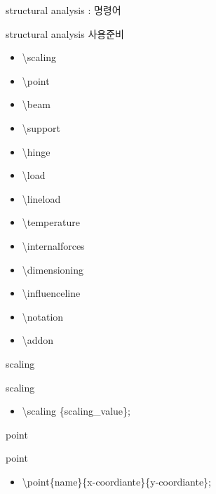 \documentclass[ aspectratio=169,  12pt,blue,xcolor=pdftex,dvipsnames,table,handout,notes]{beamer}
\begin{document}
		\begin{frame}[t]{structural analysis : 명령어}
 
			\begin{block}{structural analysis 사용준비}
			\begin{itemize}
			\item[] \textbackslash scaling 
			\item[] \textbackslash point 
			\item[] \textbackslash beam 
			\item[] \textbackslash support
			\item[] \textbackslash hinge
			\item[] \textbackslash load 
			\item[] \textbackslash lineload
			\item[] \textbackslash temperature
			\item[] \textbackslash internalforces
			\item[] \textbackslash dimensioning
			\item[] \textbackslash influenceline
			\item[] \textbackslash notation
			\item[] \textbackslash addon
			\end{itemize}
			\end{block}


		\end{frame}




		\begin{frame}[t]{scaling}
 
			\begin{block}{scaling}
			\begin{itemize}
			\item[] \textbackslash scaling \{scaling\_value\};
			\end{itemize}
			\end{block}




		\end{frame}



		\begin{frame}[t]{point}
 
			\begin{block}{point}
			\begin{itemize}
			\item[] \textbackslash point\{name\}\{x-coordiante\}\{y-coordiante\};
			\end{itemize}
			\end{block}


		\end{frame}
\end{document}
